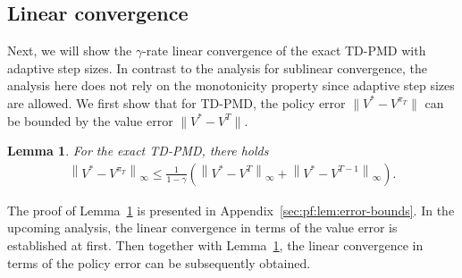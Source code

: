 \documentclass[10pt]{article}
\newcommand{\calT}{\mathcal{T}}
\newcommand{\ls}{\left}
\newcommand{\rs}{\right}
\newcommand\numberthis{\addtocounter{equation}{1}\tag{\theequation}}
\theoremstyle{plain}
\newtheorem{lemma}[theorem]{Lemma}
\theoremstyle{definition}
\begin{document}
\subsection{Linear convergence}
\label{sec:linear-convergence}
Next, we will show the $\gamma$-rate linear convergence of the exact TD-PMD with adaptive step sizes. In contrast to the analysis for sublinear convergence, the analysis here does not rely on the monotonicity property since adaptive step sizes are allowed. We first show that for TD-PMD, the policy error $\| V^* - V^{\pi_T} \|$ can be bounded by the value error $\| V^* - V^{T} \|$.
\begin{lemma}
    For the exact TD-PMD, there holds 
    \begin{align}
        \ls\| V^{*} - V^{\pi_T} \rs\|_\infty \leq \frac{1}{1-\gamma} \ls( \ls\| V^* - V^T \rs\|_\infty + \ls\| V^* - V^{T-1} \rs\|_\infty\rs).
    \end{align}
    \label{lem:error-bounds}
\end{lemma}
The proof of Lemma~\ref{lem:error-bounds} is presented in Appendix~\ref{sec:pf:lem:error-bounds}. In the upcoming analysis, the linear convergence in terms of the value error is established at first. Then together with Lemma~\ref{lem:error-bounds}, the linear convergence in terms of the policy error can be subsequently obtained.
\end{document}
